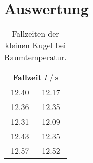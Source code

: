 \section{Auswertung}
\label{sec:Auswertung}

\begin{table}
    \centering
    \caption{Fallzeiten der kleinen Kugel bei Raumtemperatur.}
    \label{tab:mess_klKugel_raum}
    \begin{tabular}{c c}
        \toprule
        \multicolumn{2}{c}{Fallzeit $t\:/\:\si{\second}$} \\
        \midrule
        12.40 & 12.17 \\
        12.36 & 12.35 \\
        12.31 & 12.09 \\
        12.43 & 12.35 \\
        12.57 & 12.52 \\
        \bottomrule
    \end{tabular}    
\end{table}